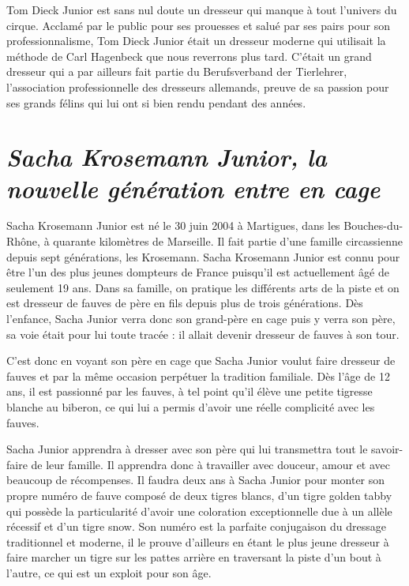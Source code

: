 Tom Dieck Junior est sans nul doute un dresseur qui manque à tout l'univers du cirque. Acclamé par le public pour ses prouesses et salué par ses pairs pour son professionnalisme, Tom Dieck Junior était un dresseur moderne qui utilisait la méthode de Carl Hagenbeck que nous reverrons plus tard. C'était un grand dresseur qui a par ailleurs fait partie du Berufsverband der Tierlehrer, l'association professionnelle des dresseurs allemands, preuve de sa passion pour ses grands félins qui lui ont si bien rendu pendant des années.

\section*{\textit{Sacha Krosemann Junior, la nouvelle génération entre en cage}}
{}

Sacha Krosemann Junior est né le 30 juin 2004 à Martigues, dans les Bouches-du-Rhône, à quarante kilomètres de Marseille. Il fait partie d'une famille circassienne depuis sept générations, les Krosemann. Sacha Krosemann Junior est connu pour être l'un des plus jeunes dompteurs de France puisqu'il est actuellement âgé de seulement 19 ans. Dans sa famille, on pratique les différents arts de la piste et on est dresseur de fauves de père en fils depuis plus de trois générations. Dès l'enfance, Sacha Junior verra donc son grand-père en cage puis y verra son père, sa voie était pour lui toute tracée : il allait devenir dresseur de fauves à son tour.

C'est donc en voyant son père en cage que Sacha Junior voulut faire dresseur de fauves et par la même occasion perpétuer la tradition familiale. Dès l'âge de 12 ans, il est passionné par les fauves, à tel point qu'il élève une petite tigresse blanche au biberon, ce qui lui a permis d'avoir une réelle complicité avec les fauves.

Sacha Junior apprendra à dresser avec son père qui lui transmettra tout le savoir-faire de leur famille. Il apprendra donc à travailler avec douceur, amour et avec beaucoup de récompenses. Il faudra deux ans à Sacha Junior pour monter son propre numéro de fauve composé de deux tigres blancs, d'un tigre golden tabby qui possède la particularité d'avoir une coloration exceptionnelle due à un allèle récessif et d'un tigre snow. Son numéro est la parfaite conjugaison du dressage traditionnel et moderne, il le prouve d'ailleurs en étant le plus jeune dresseur à faire marcher un tigre sur les pattes arrière en traversant la piste d'un bout à l'autre, ce qui est un exploit pour son âge.

